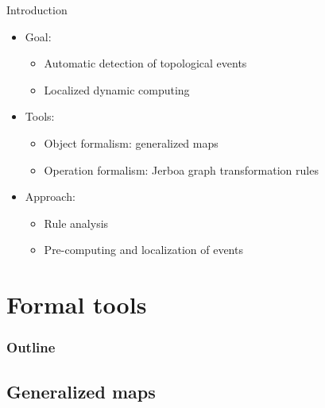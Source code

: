 \documentclass[presentation]{beamer}
\begin{document}
\begin{frame}{Introduction}
	\begin{itemize}
		\item Goal:
		      \begin{itemize}
			      \item Automatic detection of topological events
			      \item Localized dynamic computing
		      \end{itemize}

		      \vspace{1em}

		\item Tools:
		      \begin{itemize}
			      \item Object formalism: generalized maps
			      \item Operation formalism: Jerboa graph transformation rules
		      \end{itemize}

		      \vspace{1em}

		\item Approach:
		      \begin{itemize}
			      \item Rule analysis
			      \item Pre-computing and localization of events
		      \end{itemize}
	\end{itemize}
\end{frame}

\section{Formal tools}

\begin{frame}
	\frametitle{Outline}
	\tableofcontents
\end{frame}

\subsection{Generalized maps}
\end{document}
